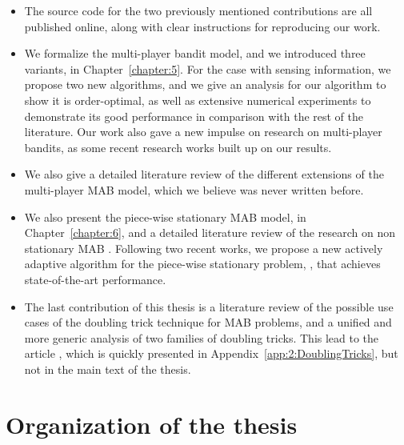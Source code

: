 \begin{itemize}
    \item
    The source code for the two previously mentioned contributions are all published online, along with clear instructions for reproducing our work.

    \item
    We formalize the multi-player bandit model, and we introduced three variants, in Chapter~\ref{chapter:5}.
    For the case with sensing information, we propose two new algorithms, and we give an analysis for our algorithm \MCTopM{} to show it is order-optimal,
    as well as extensive numerical experiments to demonstrate its good performance in comparison with the rest of the literature.
    Our work \cite{Besson2018ALT} also gave a new impulse on research on multi-player bandits, as some recent research works built up on our results.

    \item
    We also give a detailed literature review of the different extensions of the multi-player MAB model, which we believe was never written before.

    \item
    We also present the piece-wise stationary MAB model, in Chapter~\ref{chapter:6}, and a detailed literature review of the research on non stationary MAB \cite{Besson2019GLRT,Besson2019Gretsi}.
    Following two recent works, we propose a new actively adaptive algorithm for the piece-wise stationary problem, \GLRklUCB, that achieves state-of-the-art performance.

    \item
    The last contribution of this thesis is a literature review of the possible use cases of the doubling trick technique for MAB problems,
    and a unified and more generic analysis of two families of doubling tricks.
    This lead to the article \cite{Besson2018DoublingTricks}, which is quickly presented in Appendix~\ref{app:2:DoublingTricks}, but not in the main text of the thesis.
\end{itemize}


\section{Organization of the thesis}
\label{sec:1:organization}

